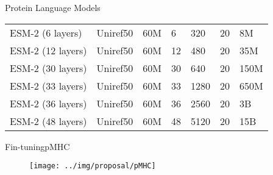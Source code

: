 \documentclass[10pt]{beamer}
\newcommand{\1}{
	\setbeamertemplate{background}{
		\texttt{[image: ../img/1]}
		\tikz[overlay] \fill[fill opacity=0.75,fill=white] (0,0) rectangle (-\paperwidth,\paperheight);
	}
}
\begin{document}
\begin{frame}{Protein Language Models}{}
\begin{table}[h]
{\begin{tabular}{lllllll}
				ESM-2 (6 layers)  & Uniref50         & 60M                   & 6               & 320                  & 20                       & 8M                  \\
				ESM-2 (12 layers)  & Uniref50         & 60M                   & 12              & 480                  & 20                       & 35M                 \\
				ESM-2 (30 layers) & Uniref50         & 60M                   & 30              & 640                  & 20                       & 150M                \\
				ESM-2 (33 layers)  & Uniref50         & 60M                   & 33              & 1280                 & 20                       & 650M               \\
				
				ESM-2 (36 layers)  & Uniref50         & 60M                   & 36              & 2560                 & 20                       & 3B               \\
				
				ESM-2 (48 layers)  & Uniref50         & 60M                   & 48              & 5120                 & 20                       & 15B               \\
				
		\end{tabular}}
		
	\end{table}
			
\end{frame}

\begin{frame}{Fin-tuning}{pMHC}	
	\begin{figure}
		\texttt{[image: ../img/proposal/pMHC]}
	\end{figure}		
\end{frame}
\end{document}
